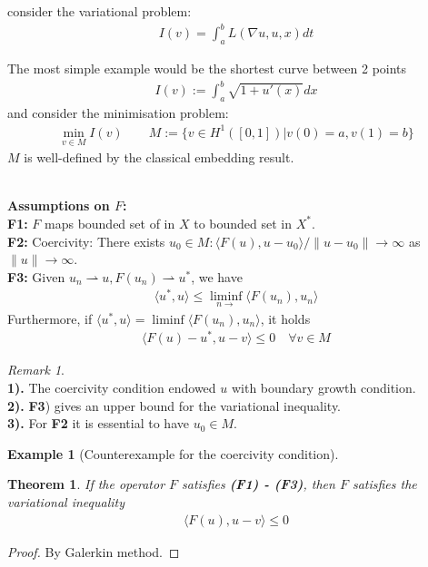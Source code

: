 \documentclass[a4paper,11pt,oneside,fleqn]{book}
\newtheorem{theorem}{Theorem}[section]
\theoremstyle{definition}
\newtheorem*{example}{Example}
\theoremstyle{remark}
\newtheorem*{remark}{Remark}
\begin{document}
consider the variational problem:
\begin{align*}
	I(v) = \int_a^b L( \nabla u, u, x) dt 
\end{align*}

The most simple example would be the shortest curve between 2 points
\begin{align*}
	I(v) := \int_a^b \sqrt{1 + u'(x)} dx  
\end{align*}
and consider the minimisation problem:
\begin{align*}
	\min_{v \in M} I(v) \qquad M := \{ v \in H^1([0, 1]) | v(0) = a, v(1) = b \}
\end{align*}
$M$ is well-defined by the classical embedding result.

\quad\\
\textbf{Assumptions on $F$:}\\
\textbf{F1:} $F$ maps bounded set of in $X$ to bounded set in $X^*$.\\
\textbf{F2:} Coercivity: There exists $u_0 \in M: \langle F(u), u - u_0 \rangle / \|u - u_0\| \rightarrow \infty$ as $\|u \| \rightarrow \infty$. \\
\textbf{F3:} Given $u_n \rightharpoonup u, F(u_n) \rightharpoonup u^*$, we have
\begin{align*}
	\langle u^*, u \rangle \le \liminf_{n \rightarrow } \langle F(u_n), u_n \rangle 
\end{align*}
Furthermore, if $\langle u^*, u \rangle = \liminf \langle F(u_n), u_n \rangle$, it holds
\begin{align*}
	\langle F(u) - u^*, u - v \rangle \le 0  \quad \forall v \in M
\end{align*}
\begin{remark}
\quad\\
\textbf{1).} The coercivity condition endowed $u$ with boundary growth condition.\\
\textbf{2).} \textbf{F3}) gives an upper bound for the variational inequality. \\
\textbf{3).} For \textbf{F2} it is essential to have $u_0 \in M$.
\end{remark}

\begin{example}[Counterexample for the coercivity condition]
\end{example}



\begin{theorem}
	If the operator $F$ satisfies \textbf{(F1) - (F3)}, then $F$ satisfies the variational inequality
	\begin{align*}
		\langle F(u), u - v \rangle \le 0
	\end{align*} 
\end{theorem}
\begin{proof}
	By Galerkin method. 
\end{proof}
\end{document}

